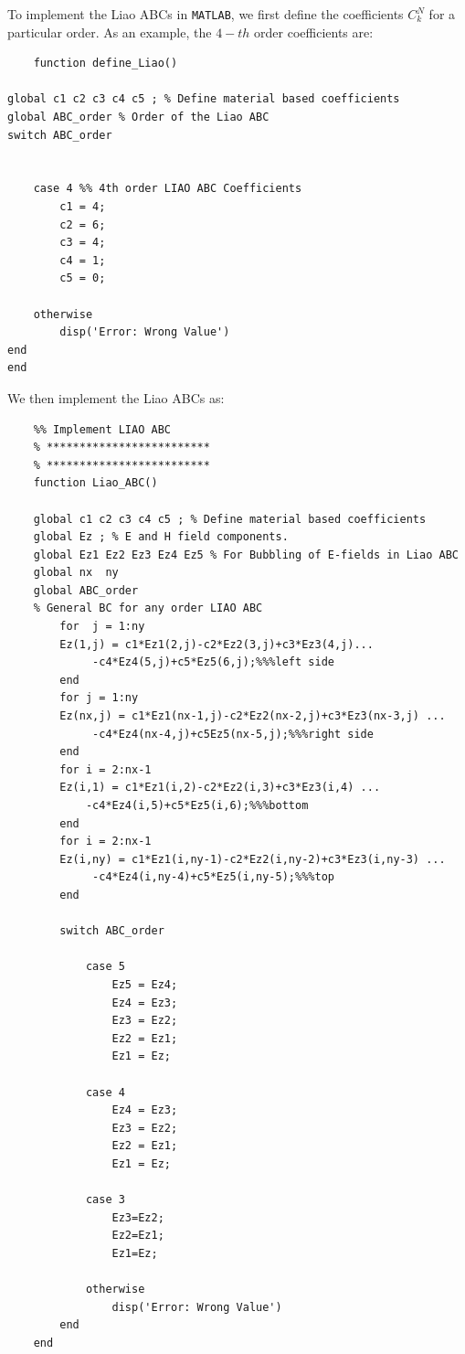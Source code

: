 \documentclass[12pt]{article}
\begin{document}
To implement the Liao ABCs in \texttt{MATLAB}, we first define the coefficients $C_k^N$ for a particular order. As an example, the $4-th$ order coefficients are:

\begin{mdframed}[backgroundcolor=gray!20]
  \scriptsize
  \begin{verbatim}
    function define_Liao()

global c1 c2 c3 c4 c5 ; % Define material based coefficients
global ABC_order % Order of the Liao ABC 
switch ABC_order
  
        
    case 4 %% 4th order LIAO ABC Coefficients
        c1 = 4;
        c2 = 6;
        c3 = 4;
        c4 = 1;
        c5 = 0;
        
    otherwise
        disp('Error: Wrong Value')
end
end
  \end{verbatim}
\end{mdframed}

We then implement the Liao ABCs as:
\begin{mdframed}[backgroundcolor=gray!20]
  \scriptsize
  \begin{verbatim}
    %% Implement LIAO ABC
    % *************************
    % *************************
    function Liao_ABC()
    
    global c1 c2 c3 c4 c5 ; % Define material based coefficients
    global Ez ; % E and H field components.
    global Ez1 Ez2 Ez3 Ez4 Ez5 % For Bubbling of E-fields in Liao ABC
    global nx  ny  
    global ABC_order
    % General BC for any order LIAO ABC
        for  j = 1:ny
        Ez(1,j) = c1*Ez1(2,j)-c2*Ez2(3,j)+c3*Ez3(4,j)...
             -c4*Ez4(5,j)+c5*Ez5(6,j);%%%left side
        end
        for j = 1:ny
        Ez(nx,j) = c1*Ez1(nx-1,j)-c2*Ez2(nx-2,j)+c3*Ez3(nx-3,j) ...
             -c4*Ez4(nx-4,j)+c5Ez5(nx-5,j);%%%right side
        end 
        for i = 2:nx-1
        Ez(i,1) = c1*Ez1(i,2)-c2*Ez2(i,3)+c3*Ez3(i,4) ...
            -c4*Ez4(i,5)+c5*Ez5(i,6);%%%bottom
        end
        for i = 2:nx-1
        Ez(i,ny) = c1*Ez1(i,ny-1)-c2*Ez2(i,ny-2)+c3*Ez3(i,ny-3) ...
             -c4*Ez4(i,ny-4)+c5*Ez5(i,ny-5);%%%top
        end
        
        switch ABC_order
            
            case 5
                Ez5 = Ez4;
                Ez4 = Ez3;
                Ez3 = Ez2;
                Ez2 = Ez1;
                Ez1 = Ez;
                
            case 4
                Ez4 = Ez3;
                Ez3 = Ez2;
                Ez2 = Ez1;
                Ez1 = Ez;
                
            case 3
                Ez3=Ez2;
                Ez2=Ez1;
                Ez1=Ez;
                
            otherwise
                disp('Error: Wrong Value')
        end
    end    
  \end{verbatim}
\end{mdframed}
\end{document}
